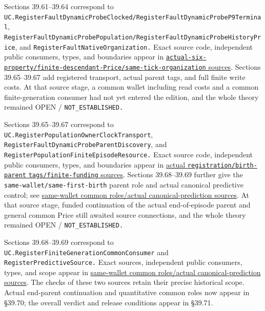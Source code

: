 \documentclass[
  english,
  11pt,
  oneside]{book}
\begin{document}
Sections 39.61--39.64 correspond to \nolinkurl{UC.RegisterFaultDynamicProbeClocked/RegisterFaultDynamicProbeP9Terminal}, \nolinkurl{RegisterFaultDynamicProbePopulation/RegisterFaultDynamicProbeHistoryPrice}, and \nolinkurl{RegisterFaultNativeOrganization.} Exact source code, independent public consumers, types, and boundaries appear in \href{../formalization/ueot-core/docs/compression/theory_completion/unified_closure/p9_lineage_organization_source_v1/RESULTS_AND_OPEN_OBLIGATIONS.md}{\nolinkurl{actual-six-property/finite-descendant-Price/same-tick-organization} sources}. Sections 39.65--39.67 add registered transport, actual parent tags, and full finite write costs. At that source stage, a common wallet including read costs and a common finite-generation consumer had not yet entered the edition, and the whole theory remained OPEN / \nolinkurl{NOT_ESTABLISHED.}

Sections 39.65--39.67 correspond to \nolinkurl{UC.RegisterPopulationOwnerClockTransport}, \nolinkurl{RegisterFaultDynamicProbeParentDiscovery}, and \nolinkurl{RegisterPopulationFiniteEpisodeResource.} Exact source code, independent public consumers, types, and boundaries appear in \href{../formalization/ueot-core/docs/compression/theory_completion/unified_closure/owner_discovery_resource_source_v1/RESULTS_AND_OPEN_OBLIGATIONS.md}{actual \nolinkurl{registration/birth-parent} \nolinkurl{tags/finite-funding} sources}. Sections 39.68--39.69 further give the \nolinkurl{same-wallet/same-first-birth} parent role and actual canonical predictive control; see \href{../formalization/ueot-core/docs/compression/theory_completion/unified_closure/finite_predictive_source_v1/RESULTS_AND_OPEN_OBLIGATIONS.md}{same-wallet common roles/actual canonical-prediction sources}. At that source stage, funded continuation of the actual end-of-episode parent and general common Price still awaited source connections, and the whole theory remained OPEN / \nolinkurl{NOT_ESTABLISHED.}

Sections 39.68--39.69 correspond to \nolinkurl{UC.RegisterFiniteGenerationCommonConsumer} and \nolinkurl{RegisterPredictiveSource.} Exact sources, independent public consumers, types, and scope appear in \href{../formalization/ueot-core/docs/compression/theory_completion/unified_closure/finite_predictive_source_v1/RESULTS_AND_OPEN_OBLIGATIONS.md}{same-wallet common roles/actual canonical-prediction sources}. The checks of these two sources retain their precise historical scope. Actual end-parent continuation and quantitative common roles now appear in §39.70; the overall verdict and release conditions appear in §39.71.
\end{document}
